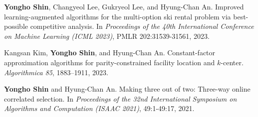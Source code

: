 \documentclass{article}
\newcommand{\killinitspace}{-0.7em}
\begin{document}
\textbf{Yongho Shin}, Changyeol Lee, Gukryeol Lee, and Hyung-Chan An. Improved learning-augmented algorithms for the multi-option ski rental problem via best-possible competitive analysis. In \emph{Proceedings of the 40th International Conference on Machine Learning (ICML 2023)}, PMLR 202:31539-31561, 2023.

Kangsan Kim, \textbf{Yongho Shin}, and Hyung-Chan An. Constant-factor approximation algorithms for parity-constrained facility location and $k$-center. \emph{Algorithmica 85}, 1883–1911, 2023.

\textbf{Yongho Shin} and Hyung-Chan An. Making three out of two: Three-way online correlated selection. In \emph{Proceedings of the 32nd International Symposium on Algorithms and Computation (ISAAC 2021)}, 49:1-49:17, 2021.
\end{document}

